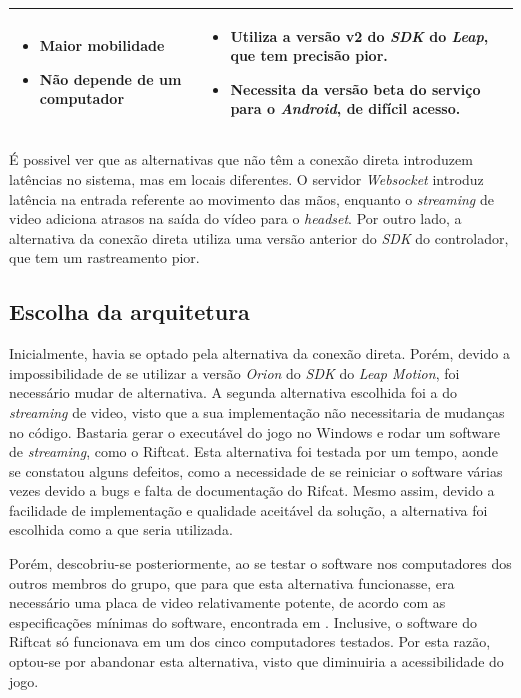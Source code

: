 \begin{quadro}[htb]
\begin{tabular}{|>{\centering\arraybackslash}m{2.1cm}|>{\centering\arraybackslash}m{6cm}|>{\centering\arraybackslash}m{6cm}|}
\begin{itemize}[label={},leftmargin=1mm]
				\item Maior mobilidade
				\item Não depende de um computador
			\end{itemize}
		&\begin{itemize}[label={},leftmargin=1mm]
				\item Utiliza a versão v2 do \textit{SDK} do \textit{Leap}, que tem precisão pior.
				\item Necessita da versão beta do serviço para o \textit{Android}, de difícil acesso.
			\end{itemize}
		\\ 
		\hline 
	\end{tabular} 

	\legend{\fonteAP}
\label{tabela:alternativas-arquiteturas}
\end{quadro}

É possivel ver que as alternativas que não têm a conexão direta 
introduzem latências no sistema, mas em locais diferentes. 
O servidor \textit{Websocket} introduz latência na entrada 
referente ao movimento das mãos, enquanto o \textit{streaming} 
de video adiciona atrasos na saída do vídeo para o \textit{headset}. 
Por outro lado, a alternativa da conexão direta utiliza uma 
versão anterior do \textit{SDK} do controlador, que tem um 
rastreamento pior.

\subsection{Escolha da arquitetura}\label{subsec-arquitetura-escolha}

Inicialmente, havia se optado pela alternativa da conexão direta. Porém, devido
a impossibilidade de se utilizar a versão \textit{Orion} do \textit{SDK} do 
\textit{Leap Motion}, foi necessário mudar de alternativa. A segunda alternativa 
escolhida foi a do \textit{streaming} de video, visto que a 
sua implementação não necessitaria de mudanças no código. Bastaria gerar 
o executável do jogo no Windows e rodar um software de \textit{streaming}, como o 
Riftcat. Esta alternativa foi testada por um tempo, aonde se constatou
alguns defeitos, como a necessidade de se reiniciar o software várias vezes 
devido a bugs e falta de documentação do Rifcat. Mesmo assim, devido a facilidade
de implementação e qualidade aceitável da solução, a alternativa foi escolhida
como a que seria utilizada.

Porém, descobriu-se posteriormente, ao se testar o software nos computadores
dos outros membros do grupo, que para que esta alternativa funcionasse, 
era necessário uma placa de video relativamente potente, de acordo com 
as especificações mínimas do software, encontrada em
\cite{riftcat:2016:requirements}. Inclusive, o software do Riftcat só 
funcionava em um dos cinco computadores testados. Por esta razão, optou-se 
por abandonar esta alternativa, visto que diminuiria a acessibilidade do jogo.

